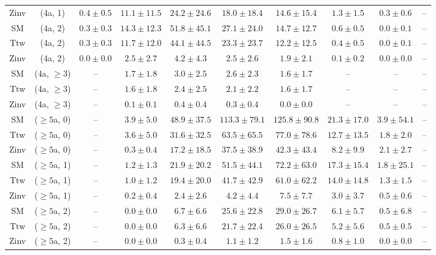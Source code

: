 \begin{table}[h!]
{\begin{tabular}{cccccccccc}
	Zinv & (4a, 1) & $0.4\pm 0.5$ & $11.1\pm 11.5$ & $24.2\pm 24.6$ & $18.0\pm 18.4$ & $14.6\pm 15.4$ & $1.3\pm 1.5$ & $0.3\pm 0.6$ & -- \\[0.5ex] 
	SM & (4a, 2) & $0.3\pm 0.3$ & $14.3\pm 12.3$ & $51.8\pm 45.1$ & $27.1\pm 24.0$ & $14.7\pm 12.7$ & $0.6\pm 0.5$ & $0.0\pm 0.1$ & -- \\[0.5ex] 
	Ttw & (4a, 2) & $0.3\pm 0.3$ & $11.7\pm 12.0$ & $44.1\pm 44.5$ & $23.3\pm 23.7$ & $12.2\pm 12.5$ & $0.4\pm 0.5$ & $0.0\pm 0.1$ & -- \\[0.5ex] 
	Zinv & (4a, 2) & $0.0\pm 0.0$ & $2.5\pm 2.7$ & $4.2\pm 4.3$ & $2.5\pm 2.6$ & $1.9\pm 2.1$ & $0.1\pm 0.2$ & $0.0\pm 0.0$ & -- \\[0.5ex] 
	SM & (4a, $\ge3$) & -- & $1.7\pm 1.8$ & $3.0\pm 2.5$ & $2.6\pm 2.3$ & $1.6\pm 1.7$ & -- & -- & -- \\[0.5ex] 
	Ttw & (4a, $\ge3$) & -- & $1.6\pm 1.8$ & $2.4\pm 2.5$ & $2.1\pm 2.2$ & $1.6\pm 1.7$ & -- & -- & -- \\[0.5ex] 
	Zinv & (4a, $\ge3$) & -- & $0.1\pm 0.1$ & $0.4\pm 0.4$ & $0.3\pm 0.4$ & $0.0\pm 0.0$ & -- & -- & -- \\[0.5ex] 
	SM & ($\ge5$a, 0) & -- & $3.9\pm 5.0$ & $48.9\pm 37.5$ & $113.3\pm 79.1$ & $125.8\pm 90.8$ & $21.3\pm 17.0$ & $3.9\pm 54.1$ & -- \\[0.5ex] 
	Ttw & ($\ge5$a, 0) & -- & $3.6\pm 5.0$ & $31.6\pm 32.5$ & $63.5\pm 65.5$ & $77.0\pm 78.6$ & $12.7\pm 13.5$ & $1.8\pm 2.0$ & -- \\[0.5ex] 
	Zinv & ($\ge5$a, 0) & -- & $0.3\pm 0.4$ & $17.2\pm 18.5$ & $37.5\pm 38.9$ & $42.3\pm 43.4$ & $8.2\pm 9.9$ & $2.1\pm 2.7$ & -- \\[0.5ex] 
	SM & ($\ge5$a, 1) & -- & $1.2\pm 1.3$ & $21.9\pm 20.2$ & $51.5\pm 44.1$ & $72.2\pm 63.0$ & $17.3\pm 15.4$ & $1.8\pm 25.1$ & -- \\[0.5ex] 
	Ttw & ($\ge5$a, 1) & -- & $1.0\pm 1.2$ & $19.4\pm 20.0$ & $41.7\pm 42.9$ & $61.0\pm 62.2$ & $14.0\pm 14.8$ & $1.3\pm 1.5$ & -- \\[0.5ex] 
	Zinv & ($\ge5$a, 1) & -- & $0.2\pm 0.4$ & $2.4\pm 2.6$ & $4.2\pm 4.4$ & $7.5\pm 7.7$ & $3.0\pm 3.7$ & $0.5\pm 0.6$ & -- \\[0.5ex] 
	SM & ($\ge5$a, 2) & -- & $0.0\pm 0.0$ & $6.7\pm 6.6$ & $25.6\pm 22.8$ & $29.0\pm 26.7$ & $6.1\pm 5.7$ & $0.5\pm 6.8$ & -- \\[0.5ex] 
	Ttw & ($\ge5$a, 2) & -- & $0.0\pm 0.0$ & $6.3\pm 6.6$ & $21.7\pm 22.4$ & $26.0\pm 26.5$ & $5.2\pm 5.6$ & $0.5\pm 0.5$ & -- \\[0.5ex] 
	Zinv & ($\ge5$a, 2) & -- & $0.0\pm 0.0$ & $0.3\pm 0.4$ & $1.1\pm 1.2$ & $1.5\pm 1.6$ & $0.8\pm 1.0$ & $0.0\pm 0.0$ & -- \\[0.5ex] 

\end{tabular}}
\end{table}
